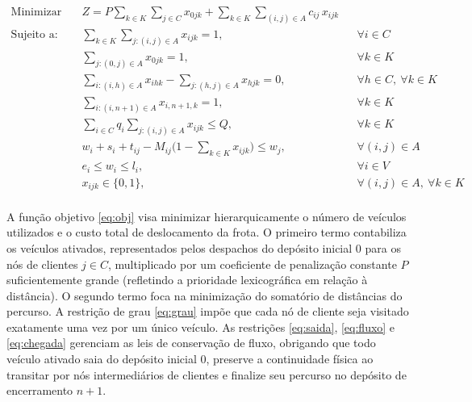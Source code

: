 \begin{align}
\text{Minimizar} \quad & Z = P \sum_{k \in K} \sum_{j \in C} x_{0jk} + \sum_{k \in K} \sum_{(i,j) \in A} c_{ij}\, x_{ijk}
  \label{eq:obj}\\[4pt]
\text{Sujeito a:} \quad
& \sum_{k \in K} \sum_{j:(i,j)\in A} x_{ijk} = 1,
  && \forall i \in C \label{eq:grau}\\[2pt]
& \sum_{j:(0,j)\in A} x_{0jk} = 1,
  && \forall k \in K \label{eq:saida}\\[2pt]
& \sum_{i:(i,h)\in A} x_{ihk} - \sum_{j:(h,j)\in A} x_{hjk} = 0,
  && \forall h \in C,\ \forall k \in K \label{eq:fluxo}\\[2pt]
& \sum_{i:(i,n+1)\in A} x_{i,n+1,k} = 1,
  && \forall k \in K \label{eq:chegada}\\[2pt]
& \sum_{i \in C} q_i \sum_{j:(i,j)\in A} x_{ijk} \le Q,
  && \forall k \in K \label{eq:cap}\\[2pt]
& w_i + s_i + t_{ij} - M_{ij}\bigl(1 - \textstyle\sum_{k\in K} x_{ijk}\bigr) \le w_j,
  && \forall (i,j) \in A \label{eq:tempo}\\[2pt]
& e_i \le w_i \le l_i,
  && \forall i \in V \label{eq:janela}\\[2pt]
& x_{ijk} \in \{0,1\},
  && \forall (i,j) \in A,\ \forall k \in K \label{eq:dominio}
\end{align}

\paragraph{} A função objetivo \eqref{eq:obj} visa minimizar hierarquicamente o número de veículos utilizados e o custo total de deslocamento da frota. O primeiro termo contabiliza os veículos ativados, representados pelos despachos do depósito inicial $0$ para os nós de clientes $j \in C$, multiplicado por um coeficiente de penalização constante $P$ suficientemente grande (refletindo a prioridade lexicográfica em relação à distância). O segundo termo foca na minimização do somatório de distâncias do percurso. A restrição de grau \eqref{eq:grau} impõe que cada nó de cliente seja visitado exatamente uma vez por um único veículo. As restrições \eqref{eq:saida}, \eqref{eq:fluxo} e \eqref{eq:chegada} gerenciam as leis de conservação de fluxo, obrigando que todo veículo ativado saia do depósito inicial $0$, preserve a continuidade física ao transitar por nós intermediários de clientes e finalize seu percurso no depósito de encerramento $n+1$. 

